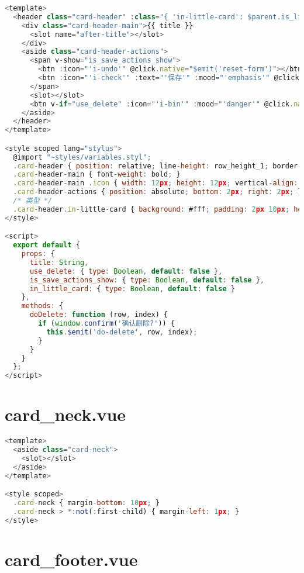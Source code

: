 \begin{lstlisting}[language=JavaScript]
<template>
  <header class="card-header" :class="{ 'in-little-card': $parent.is_little }">
    <div class="card-header-main">{{ title }}
      <slot name="after-title"></slot>
    </div>
    <aside class="card-header-actions">
      <span v-show="is_save_actions_show">
        <btn :icon="'i-undo'" @click.native="$emit('reset-form')"></btn>
        <btn :icon="'i-check'" :text="'保存'" :mood="'emphasis'" @click.native="$emit('save-form')"></btn>
      </span>
      <slot></slot>
      <btn v-if="use_delete" :icon="'i-bin'" :mood="'danger'" @click.native="doDelete"></btn>
    </aside>
  </header>
</template>

<style scoped lang="stylus">
  @import "~styles/variables.styl";
  .card-header { position: relative; line-height: row_height_1; border-bottom: 1px solid light_gray_1; margin-bottom: 10px; }
  .card-header-main { font-weight: bold; }
  .card-header-main .icon { width: 12px; height: 12px; vertical-align: -2px; margin-left: 5px; }
  .card-header-actions { position: absolute; bottom: 2px; right: 2px; }
  /* 类型 */
  .card-header.in-little-card { background: #fff; padding: 2px 10px; height: 26px; margin-bottom: 0; border: none; }
</style>

<script>
  export default {
    props: {
      title: String,
      use_delete: { type: Boolean, default: false },
      is_save_actions_show: { type: Boolean, default: false },
      in_little_card: { type: Boolean, default: false }
    },
    methods: {
      doDelete: function (row, index) {
        if (window.confirm('确认删除?')) {
          this.$emit('do-delete', row, index);
        }
      }
    }
  };
</script>

\end{lstlisting}


\section{card\_neck.vue}


\begin{lstlisting}[language=JavaScript]
<template>
  <aside class="card-neck">
    <slot></slot>
  </aside>
</template>

<style scoped>
  .card-neck { margin-bottom: 10px; }
  .card-neck > *:not(:first-child) { margin-left: 1px; }
</style>
\end{lstlisting}


\section{card\_footer.vue}


